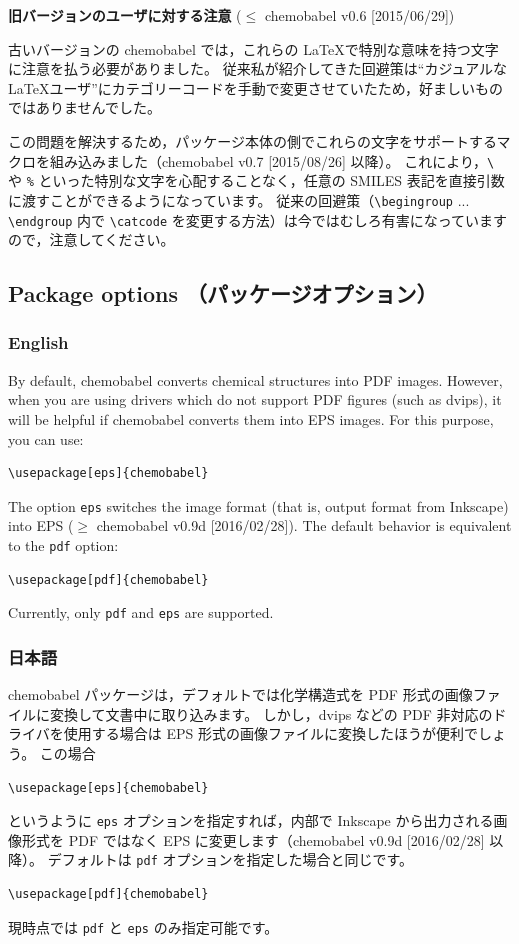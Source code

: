\documentclass[12pt]{jsarticle}
\begin{document}
\noindent \textbf{旧バージョンのユーザに対する注意} ($\le$ \textsf{chemobabel} v0.6 [2015/06/29])

古いバージョンの \textsf{chemobabel} では，これらの \LaTeX で特別な意味を持つ文字に注意を払う必要がありました。
従来私が紹介してきた回避策は“カジュアルな \LaTeX ユーザ”にカテゴリーコードを手動で変更させていたため，好ましいものではありませんでした。

この問題を解決するため，パッケージ本体の側でこれらの文字をサポートするマクロを組み込みました（\textsf{chemobabel} v0.7 [2015/08/26] 以降）。
これにより，\verb|\| や \verb|%| といった特別な文字を心配することなく，任意の SMILES 表記を直接引数に渡すことができるようになっています。
従来の回避策（\verb|\begingroup| ... \verb|\endgroup| 内で \verb|\catcode| を変更する方法）は今ではむしろ有害になっていますので，注意してください。

\clearpage

\subsection{Package options （パッケージオプション）}

\subsubsection{English}

By default, \textsf{chemobabel} converts chemical structures into PDF images.
However, when you are using drivers which do not support PDF figures (such as dvips), it will be helpful if \textsf{chemobabel} converts them into EPS images.
For this purpose, you can use:
\begin{verbatim}
\usepackage[eps]{chemobabel}
\end{verbatim}
The option \verb|eps| switches the image format (that is, output format from Inkscape) into EPS ($\ge$ \textsf{chemobabel} v0.9d [2016/02/28]).
The default behavior is equivalent to the \verb|pdf| option:
\begin{verbatim}
\usepackage[pdf]{chemobabel}
\end{verbatim}
Currently, only \verb|pdf| and \verb|eps| are supported.

\subsubsection{日本語}

\textsf{chemobabel} パッケージは，デフォルトでは化学構造式を PDF 形式の画像ファイルに変換して文書中に取り込みます。
しかし，dvips などの PDF 非対応のドライバを使用する場合は EPS 形式の画像ファイルに変換したほうが便利でしょう。
この場合
\begin{verbatim}
\usepackage[eps]{chemobabel}
\end{verbatim}
というように \verb|eps| オプションを指定すれば，内部で Inkscape から出力される画像形式を PDF ではなく EPS に変更します（\textsf{chemobabel} v0.9d [2016/02/28] 以降）。
デフォルトは \verb|pdf| オプションを指定した場合と同じです。
\begin{verbatim}
\usepackage[pdf]{chemobabel}
\end{verbatim}
現時点では \verb|pdf| と \verb|eps| のみ指定可能です。
\end{document}

